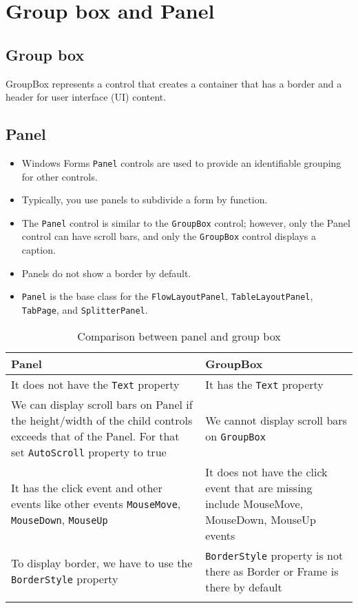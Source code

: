 \section{Group box and Panel}
\subsection{Group box}
GroupBox represents a control that creates a container that has a border and a header for user interface (UI) content.

\subsection{Panel}
\begin{itemize}
	\item Windows Forms \texttt{Panel} controls are used to provide an identifiable grouping for other controls.
	\item Typically, you use panels to subdivide a form by function. 
	\item The \texttt{Panel} control is similar to the \texttt{GroupBox} control; however, only the Panel control can have scroll bars, and only the \texttt{GroupBox}
	control displays a caption.
	\item Panels do not show a border by default.
	\item \texttt{Panel} is the base class for the \texttt{FlowLayoutPanel}, \texttt{TableLayoutPanel}, \texttt{TabPage}, and \texttt{SplitterPanel}.
\end{itemize}


\begin{longtable}[ht]{p{5.5cm}p{5.5cm}}	
	\toprule
	\textbf{Panel} 			& \textbf{GroupBox} \\
	\midrule
	\endhead
	It does not have the \texttt{Text} property 		& It has the \texttt{Text} property\\
	
	We can display scroll bars on Panel if the height/width of the child controls exceeds that of the Panel. For that set \texttt{AutoScroll} property to true  & We cannot display scroll bars on \texttt{GroupBox} \\
	
	It has the click event and other events like other events
	\texttt{MouseMove}, \texttt{MouseDown}, \texttt{MouseUp} & It does not have the click event
	that are missing include MouseMove, MouseDown, MouseUp events\\
	
	To display border, we have to use the \texttt{BorderStyle} property & \texttt{BorderStyle} property is not there as Border or Frame is there by default \\
	\bottomrule
	\caption{Comparison between panel and group box}
\end{longtable}

